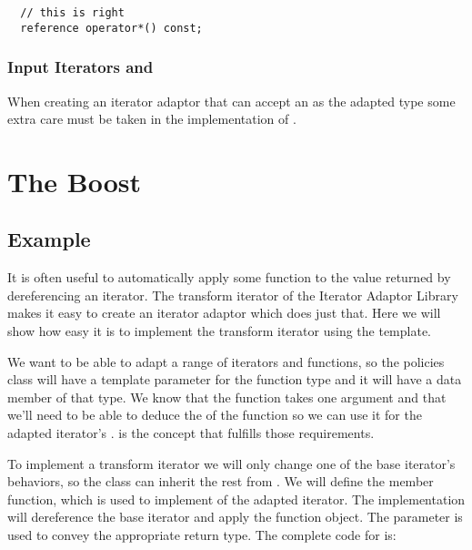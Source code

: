 \documentclass{netobjectdays}
\begin{document}
{\footnotesize
\begin{verbatim}
  // this is right
  reference operator*() const;
\end{verbatim}
}


\subsubsection{Input Iterators and }

When creating an iterator adaptor that can accept an
 as the adapted type some extra care must be
taken in the implementation of . 





\section{The Boost }



\subsection{Example}

It is often useful to automatically apply some function to the value
returned by dereferencing an iterator. The transform iterator of the
Iterator Adaptor Library makes it easy to create an iterator adaptor
which does just that. Here we will show how easy it is to implement
the transform iterator using the
 template.

We want to be able to adapt a range of iterators and functions, so the
policies class will have a template parameter for the function type
and it will have a data member of that type. We know that the function
takes one argument and that we'll need to be able to deduce the
 of the function so we can use it for the adapted
iterator's .  is
the \textsf{concept}\cite{austern99:_gener_progr_stl} that fulfills
those requirements.

To implement a transform iterator we will only change one of the base
iterator's behaviors, so the 
class can inherit the rest from . We
will define the  member function, which is used
to implement  of the adapted iterator. The
implementation will dereference the base iterator and apply the
function object. The  parameter is used
to convey the appropriate return type. The complete code for
 is:
\end{document}
